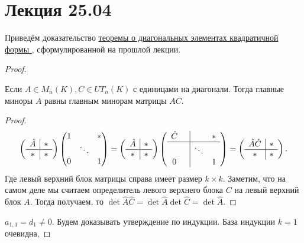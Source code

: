 \section{Лекция 25.04}
Приведём доказательство \hyperref[thm:Формула для диагональных элементов квадратичной формы]{
    теоремы о диагональных элементах квадратичной формы
}, сформулированной на прошлой лекции.
\begin{proof}
    \begin{lemma}
        Если $A\in M_n(K), C\in UT_n(K)$ с единицами на диагонали. Тогда главные миноры
        $A$ равны главным минорам матрицы $AC$.
    \end{lemma}
    \begin{proof}
        \[
        \left(\begin{array}{c|c}
                \hat{A} & * \\
                \hline
                 *& *
        \end{array}\right)
        \begin{pmatrix}
            1 & & *\\
              &\ddots&\\
            0 & & 1
        \end{pmatrix} =
        \left(\begin{array}{c|c}
                \hat{A} & * \\
                \hline
                * & *
        \end{array}\right)
        \left(\begin{array}{cc|cc}
                \hat{C} & & &* \\
                \hline
                &&\ddots&\\
                0&&&1
        \end{array}\right)=
        \left(\begin{array}{c|c}
                \hat{A} \hat{C} & * \\
                \hline
                 * & *
        \end{array}\right)
        .\] 
        Где левый верхний блок матрицы справа имеет размер $k\times k$.
        Заметим, что на самом деле мы считаем определитель левого верхнего блока $C$ на левый верхний блок $A$.
        Тогда получаем, то  $\det \hat{A} \hat{C} = \det \hat{A} \det \hat{C} = \det \hat{A}$.
    \end{proof}
    $a_{1,1} = d_1 \neq 0$.
    Будем доказывать утверждение по индукции. База индукции $k = 1$ очевидна,

\end{proof}
